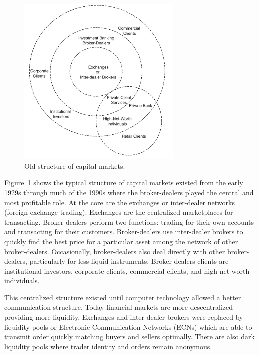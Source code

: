 \begin{figure}[!h]
  \centering
  \includegraphics[width=0.7\textwidth]{img/capitalmarkets}
  \caption{Old structure of capital markets.}
  \label{fig:capitalmarket}
\end{figure}


Figure~\ref{fig:capitalmarket} shows the typical structure of capital markets
existed from the early 1929s through much of the 1990s where the broker-dealers
played the central and most profitable role.  At the core are the exchanges or
inter-dealer networks (foreign exchange trading). Exchanges are the centralized
marketplaces for transacting.  Broker-dealers perform two functions: trading for
their own accounts and transacting for their customers. Broker-dealers use
inter-dealer brokers to quickly find the best price for a particular asset among
the network of other broker-dealers. Occasionally, broker-dealers also deal
directly with other broker-dealers, particularly for less liquid instruments.
Broker-dealers clients are institutional investors, corporate clients,
commercial clients, and high-net-worth individuals.



This centralized structure existed until computer technology allowed a better
communication structure. Today financial markets are more descentralized
providing more liquidity. Exchanges and inter-dealer brokers were replaced by
liquidity pools or Electronic Communication Networks (ECNs) which are able to
transmit order quickly matching buyers and sellers optimally. There are also
dark liquidity pools where trader identity and orders remain anonymous.

